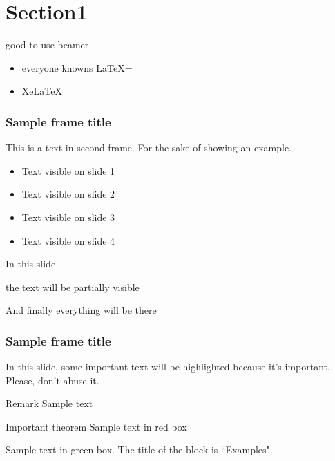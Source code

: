 \section{Section1}

\begin{frame}{good to use beamer}
    \begin{itemize}[<+-| alert@+>]
        \item everyone knowns \LaTeX{}=
        \item  Xe\LaTeX{} 
    \end{itemize}
\end{frame}

\begin{frame}
\frametitle{Sample frame title}
This is a text in second frame. 
For the sake of showing an example.

\begin{itemize}
 \item<1-> Text visible on slide 1
 \item<2-> Text visible on slide 2
 \item<3> Text visible on slide 3
 \item<4-> Text visible on slide 4
\end{itemize}
\end{frame}


\begin{frame}
 In this slide \pause

 the text will be partially visible \pause

 And finally everything will be there
\end{frame}



\begin{frame}
\frametitle{Sample frame title}

In this slide, some important text will be
\alert{highlighted} because it's important.
Please, don't abuse it.

\begin{block}{Remark}
Sample text
\end{block}

\begin{alertblock}{Important theorem}
Sample text in red box
\end{alertblock}

\begin{examples}
Sample text in green box. The title of the block is ``Examples".
\end{examples}
\end{frame}

